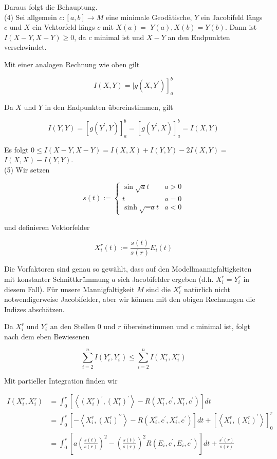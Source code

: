 \documentclass[10pt]{article}
\begin{document}
Daraus folgt die Behauptung.\\
(4) Sei allgemein $c:[a, b] \rightarrow M$ eine minimale Geodätische, $Y$ ein Jacobifeld längs $c$ und $X$ ein Vektorfeld längs $c$ mit $X(a)=$ $Y(a), X(b)=Y(b)$. Dann ist $I(X-Y, X-Y) \geq 0$, da $c$ minimal ist und $X-Y$ an den Endpunkten verschwindet.

Mit einer analogen Rechnung wie oben gilt

$$
\left.I(X, Y)=\mid g\left(X, Y^{\prime}\right)\right]_{a}^{b}
$$

Da $X$ und $Y$ in den Endpunkten übereinstimmen, gilt

$$
I(Y, Y)=\left[g\left(Y^{\prime}, Y\right)\right]_{a}^{b}=\left[g\left(Y^{\prime}, X\right)\right]_{a}^{b}=I(X, Y)
$$

Es folgt $0 \leq I(X-Y, X-Y)=I(X, X)+I(Y, Y)-2 I(X, Y)=$ $I(X, X)-I(Y, Y)$.\\
(5) Wir setzen

$$
s(t):= \begin{cases}\sin \sqrt{a} t & a>0 \\ t & a=0 \\ \sinh \sqrt{-a} t & a<0\end{cases}
$$

und definieren Vektorfelder

$$
X_{i}^{r}(t):=\frac{s(t)}{s(r)} E_{i}(t)
$$

Die Vorfaktoren sind genau so gewählt, dass auf den Modellmannigfaltigkeiten mit konstanter Schnittkrümmung $a$ sich Jacobifelder ergeben (d.h. $X_{i}^{r}=Y_{i}^{r}$ in diesem Fall). Für unsere Mannigfaltigkeit $M$ sind die $X_{i}^{r}$ natürlich nicht notwendigerweise Jacobifelder, aber wir können mit den obigen Rechnungen die Indizes abschätzen.

Da $X_{i}^{r}$ und $Y_{i}^{r}$ an den Stellen 0 und $r$ übereinstimmen und $c$ minimal ist, folgt nach dem eben Bewiesenen

$$
\sum_{i=2}^{n} I\left(Y_{i}^{r}, Y_{i}^{r}\right) \leq \sum_{i=2}^{n} I\left(X_{i}^{r}, X_{i}^{r}\right)
$$

Mit partieller Integration finden wir

$$
\begin{aligned}
I\left(X_{i}^{r}, X_{i}^{r}\right) & =\int_{0}^{r}\left[\left\langle\left(X_{i}^{r}\right)^{\prime},\left(X_{i}^{r}\right)^{\prime}\right\rangle-R\left(X_{i}^{r}, c^{\prime}, X_{i}^{r}, c^{\prime}\right)\right] d t \\
& =\int_{0}^{r}\left[-\left\langle X_{i}^{r},\left(X_{i}^{r}\right)^{\prime \prime}\right\rangle-R\left(X_{i}^{r}, c^{\prime}, X_{i}^{r}, c^{\prime}\right)\right] d t+\left[\left\langle X_{i}^{r},\left(X_{i}^{r}\right)^{\prime}\right\rangle\right]_{0}^{r} \\
& =\int_{0}^{r}\left[a\left(\frac{s(t)}{s(r)}\right)^{2}-\left(\frac{s(t)}{s(r)}\right)^{2} R\left(E_{i}, c^{\prime}, E_{i}, c^{\prime}\right)\right] d t+\frac{s^{\prime}(r)}{s(r)}
\end{aligned}
$$
\end{document}
